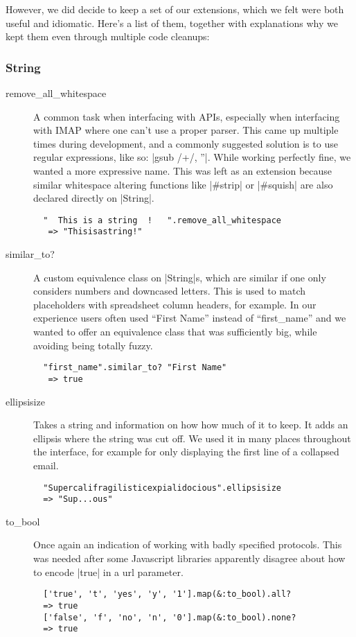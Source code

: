 However, we did decide to keep a set of our extensions, which we felt were both useful and idiomatic. Here's a list of them, together with explanations why we kept them even through multiple code cleanups:

\subsubsection{String}

\begin{description}

\item[remove\_all\_whitespace] A common task when interfacing with APIs, especially when interfacing with IMAP where one can't use a proper parser. This came up multiple times during development, and a commonly suggested solution is to use regular expressions, like so: |gsub /\s+/, ''|. While working perfectly fine, we wanted a more expressive name. This was left as an extension because similar whitespace altering functions like |#strip| or  |#squish| are also declared directly on |String|.
\\
\begin{lstlisting}
  "  This is a string  !   ".remove_all_whitespace
   => "Thisisastring!"
\end{lstlisting}

\item[similar\_to?] A custom equivalence class on |String|s, which are similar if one only considers numbers and downcased letters. This is used to match placeholders with spreadsheet column headers, for example.
In our experience users often used ``First Name'' instead of ``first\_name'' and we wanted to offer an equivalence class that was sufficiently big, while avoiding being totally fuzzy.
\\
\begin{lstlisting}
  "first_name".similar_to? "First Name"
   => true
\end{lstlisting}

\item[ellipsisize] Takes a string and information on how how much of it to keep. It adds an ellipsis where the string was cut off. We used it in many places throughout the interface, for example for only displaying the first line of a collapsed email.
\\
\begin{lstlisting}
  "Supercalifragilisticexpialidocious".ellipsisize
  => "Sup...ous"
\end{lstlisting}


\item[to\_bool] Once again an indication of working with badly specified protocols. This was needed after some Javascript libraries apparently disagree about how to encode |true| in a \gls{url} parameter.
\\
\begin{lstlisting}
  ['true', 't', 'yes', 'y', '1'].map(&:to_bool).all?
  => true
  ['false', 'f', 'no', 'n', '0'].map(&:to_bool).none?
  => true
\end{lstlisting}

\end{description}

